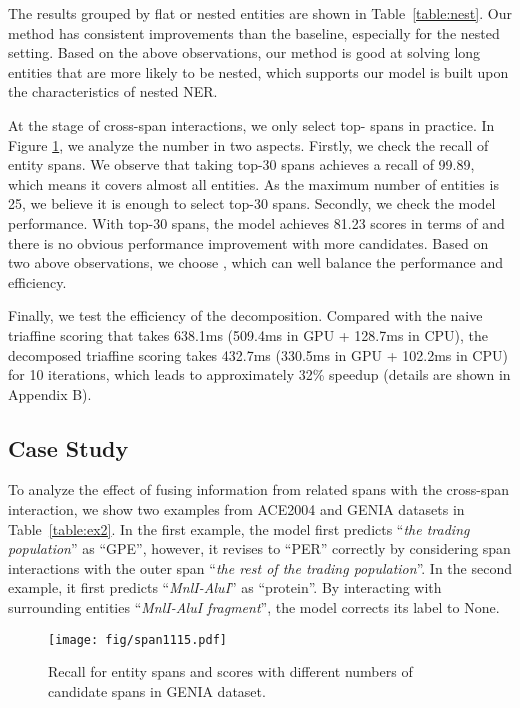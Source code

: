 \documentclass[11pt]{article}
\begin{document}
The results grouped by flat or nested entities are shown in Table~\ref{table:nest}. Our method has consistent improvements than the baseline, especially for the nested setting. Based on the above observations, our method is good at solving long entities that are more likely to be nested, which supports our model is built upon the characteristics of nested NER.

At the stage of cross-span interactions, we only select top- spans in practice. In Figure \ref{ablation:genia span}, we analyze the number  in two aspects. Firstly, we check the recall of entity spans.
We observe that taking top-30 spans achieves a recall of 99.89, which means it covers almost all entities. As the maximum number of entities is 25, we believe it is enough to select top-30 spans. Secondly, we check the model performance. With top-30 spans, the model achieves 81.23 scores in terms of  and there is no obvious performance improvement with more candidates. Based on two above observations, we choose , which can well balance the performance and efficiency.





Finally, we test the efficiency of the decomposition. 
Compared with the naive triaffine scoring that takes 638.1ms (509.4ms in GPU + 128.7ms in CPU), the decomposed triaffine scoring takes 432.7ms (330.5ms in GPU + 102.2ms in CPU) for 10 iterations, which leads to approximately 32\% speedup (details are shown in Appendix B).



\subsection{Case Study}


To analyze the effect of fusing information from related spans with the cross-span interaction, we show two examples from ACE2004 and GENIA datasets in Table~\ref{table:ex2}.
In the first example, the model first predicts ``\textit{the trading population}'' as ``GPE'', however, it revises to ``PER'' correctly by considering span interactions with the outer span ``\textit{the rest of the trading population}''.
In the second example, it first predicts ``\textit{MnlI-AluI}'' as ``protein''. By interacting with surrounding entities ``\textit{MnlI-AluI fragment}'', the model corrects its label to None. 

\begin{figure}[t]
\centering
\texttt{[image: fig/span1115.pdf]}
\caption{Recall for entity spans and  scores with different numbers of candidate spans in GENIA dataset.}
\label{ablation:genia span}
\end{figure}
\end{document}
